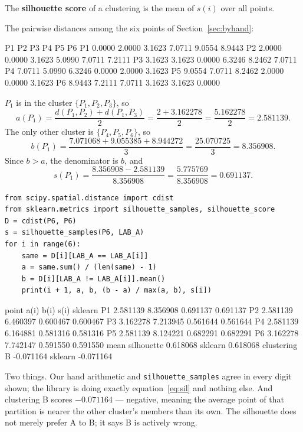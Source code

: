 \documentclass[11pt]{article}
\begin{document}
The \textbf{silhouette score} of a clustering is the mean of $s(i)$ over all
points.

\begin{worked}
The pairwise distances among the six points of Section~\ref{sec:byhand}:
\begin{codeout}
            P1      P2      P3      P4      P5      P6
  P1    0.0000  2.0000  3.1623  7.0711  9.0554  8.9443
  P2    2.0000  0.0000  3.1623  5.0990  7.0711  7.2111
  P3    3.1623  3.1623  0.0000  6.3246  8.2462  7.0711
  P4    7.0711  5.0990  6.3246  0.0000  2.0000  3.1623
  P5    9.0554  7.0711  8.2462  2.0000  0.0000  3.1623
  P6    8.9443  7.2111  7.0711  3.1623  3.1623  0.0000
\end{codeout}
$P_1$ is in the cluster $\{P_1,P_2,P_3\}$, so
\[
  a(P_1) = \frac{d(P_1,P_2) + d(P_1,P_3)}{2}
         = \frac{2 + 3.162278}{2} = \frac{5.162278}{2} = 2.581139 .
\]
The only other cluster is $\{P_4,P_5,P_6\}$, so
\[
  b(P_1) = \frac{7.071068 + 9.055385 + 8.944272}{3}
         = \frac{25.070725}{3} = 8.356908 .
\]
Since $b > a$, the denominator is $b$, and
\[
  s(P_1) = \frac{8.356908 - 2.581139}{8.356908}
         = \frac{5.775769}{8.356908} = \mathbf{0.691137}.
\]
\end{worked}

\begin{lstlisting}
from scipy.spatial.distance import cdist
from sklearn.metrics import silhouette_samples, silhouette_score
D = cdist(P6, P6)
s = silhouette_samples(P6, LAB_A)
for i in range(6):
    same = D[i][LAB_A == LAB_A[i]]
    a = same.sum() / (len(same) - 1)
    b = D[i][LAB_A != LAB_A[i]].mean()
    print(i + 1, a, b, (b - a) / max(a, b), s[i])
\end{lstlisting}
\begin{codeout}
point       a(i)      b(i)      s(i)   sklearn
  P1    2.581139  8.356908  0.691137  0.691137
  P2    2.581139  6.460397  0.600467  0.600467
  P3    3.162278  7.213945  0.561644  0.561644
  P4    2.581139  6.164881  0.581316  0.581316
  P5    2.581139  8.124221  0.682291  0.682291
  P6    3.162278  7.742147  0.591550  0.591550
mean silhouette  0.618068   sklearn 0.618068
clustering B     -0.071164   sklearn -0.071164
\end{codeout}

Two things. Our hand arithmetic and \texttt{silhouette\_samples} agree in
every digit shown; the library is doing exactly equation~\eqref{eq:sil} and
nothing else. And clustering B scores $\mathbf{-0.071164}$ --- negative,
meaning the average point of that partition is nearer the other cluster's
members than its own. The silhouette does not merely prefer A to B; it says B
is actively wrong.
\end{document}
